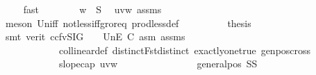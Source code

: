 \begin{isabellebody}
\ {}{\isacharparenleft}{\kern0pt}{}{\isacharparenright}{\kern0pt}\ {}\ \isamarkupfalse%
\ fast\isanewline
\ \ \ \ \ \ \isamarkupfalse%
\ {\isachardoublequoteopen}w\ {\isasymin}\ S{}{\isachardoublequoteclose}\ \isamarkupfalse%
\ uvw\ assms{\isacharparenleft}{\kern0pt}{}{\isacharparenright}{\kern0pt}\ {}\ {}{\isacharparenleft}{\kern0pt}{}{\isacharparenright}{\kern0pt}\isanewline
\ \ \ \ \ \ \ \ \isamarkupfalse%
\ {\isacharparenleft}{\kern0pt}meson\ Un{\isacharunderscore}{\kern0pt}iff\ not{\isacharunderscore}{\kern0pt}less{\isacharunderscore}{\kern0pt}iff{\isacharunderscore}{\kern0pt}gr{\isacharunderscore}{\kern0pt}or{\isacharunderscore}{\kern0pt}eq\ prod{\isacharunderscore}{\kern0pt}less{\isacharunderscore}{\kern0pt}def{\isacharparenright}{\kern0pt}\isanewline
\ \ \ \ \ \ \isamarkupfalse%
\ \isamarkupfalse%
\ {\isacharquery}{\kern0pt}thesis\isanewline
\ \ \ \ \ \ \ \ \isamarkupfalse%
\ {\isacharparenleft}{\kern0pt}smt\ {\isacharparenleft}{\kern0pt}verit{\isacharcomma}{\kern0pt}\ ccfv{\isacharunderscore}{\kern0pt}SIG{\isacharparenright}{\kern0pt}\ {\isachardoublequoteopen}{}{\isachardoublequoteclose}\ {\isachardoublequoteopen}{}{\isachardoublequoteclose}\ {\isachardoublequoteopen}{}{\isachardoublequoteclose}{\isacharparenleft}{\kern0pt}{}{\isacharparenright}{\kern0pt}\ UnE\ C{}\ asm{\isacharparenleft}{\kern0pt}{}{\isacharparenright}{\kern0pt}\ assms{\isacharparenleft}{\kern0pt}{}{\isacharcomma}{\kern0pt}{}{\isacharparenright}{\kern0pt}\isanewline
\ \ \ \ \ \ \ \ \ \ \ \ collinear{}{\isacharunderscore}{\kern0pt}def\ distinctFst{\isacharunderscore}{\kern0pt}distinct\ exactly{\isacharunderscore}{\kern0pt}one{\isacharunderscore}{\kern0pt}true\ genpos{\isacharunderscore}{\kern0pt}cross{}\isanewline
\ \ \ \ \ \ \ \ \ \ \ \ slope{\isacharunderscore}{\kern0pt}cap{}\ uvw{\isacharparenleft}{\kern0pt}{}{\isacharparenright}{\kern0pt}{\isacharparenright}{\kern0pt}\isanewline
\ \ \ \ \isamarkupfalse%
\ \ \ \ \isanewline
\ \ \isamarkupfalse%
\isanewline
\ \ \isamarkupfalse%
\ {\isachardoublequoteopen}general{\isacharunderscore}{\kern0pt}pos\ {\isacharparenleft}{\kern0pt}S{}{\isasymunion}S{}{\isacharparenright}{\kern0pt}{\isachardoublequoteclose}\ \isamarkupfalse%

\end{isabellebody}
